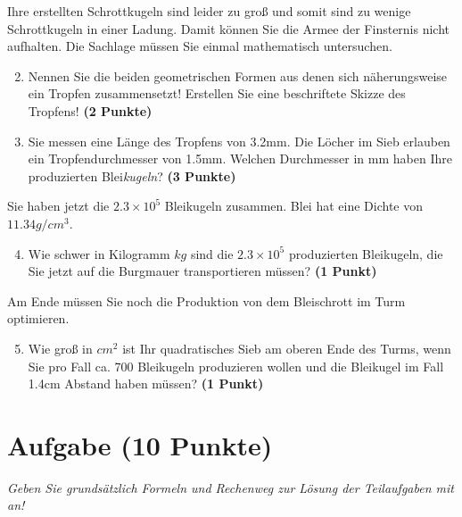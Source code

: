 \documentclass[a4paper, 9pt]{scrartcl}\usepackage[]{graphicx}\usepackage[]{xcolor}
\begin{document}
Ihre erstellten Schrottkugeln sind leider zu gro{\ss} und somit sind zu wenige
Schrottkugeln in einer Ladung. Damit k{\"o}nnen Sie die Armee der Finsternis
nicht aufhalten. Die Sachlage m{\"u}ssen Sie einmal mathematisch untersuchen.

\begin{enumerate}
  \setcounter{enumi}{1}
\item Nennen Sie die beiden geometrischen Formen aus denen sich
  n{\"a}herungsweise ein Tropfen zusammensetzt! Erstellen Sie eine beschriftete 
  Skizze des Tropfens!
  \textbf{(2 Punkte)}
\item Sie messen eine L{\"a}nge des Tropfens von 3.2mm. Die L{\"o}cher
  im Sieb erlauben ein Tropfendurchmesser von 1.5mm. Welchen
  Durchmesser in mm haben Ihre produzierten Blei\textit{kugeln}?  \textbf{(3 Punkte)}
\end{enumerate}

Sie haben jetzt die \ensuremath{2.3\times 10^{5}} Bleikugeln zusammen. Blei hat eine Dichte
von $11.34g/cm^3$.

\begin{enumerate}
  \setcounter{enumi}{3}
\item Wie schwer in Kilogramm $kg$ sind die \ensuremath{2.3\times 10^{5}} produzierten
  Bleikugeln, die Sie jetzt auf die Burgmauer transportieren m{\"u}ssen?
  \textbf{(1 Punkt)}
\end{enumerate}

Am Ende m{\"u}ssen Sie noch die Produktion von dem Bleischrott im Turm optimieren.

\begin{enumerate}
  \setcounter{enumi}{4}
\item Wie gro{\ss} in $cm^2$ ist Ihr quadratisches Sieb am oberen Ende des Turms,
  wenn Sie pro Fall ca. 700 Bleikugeln produzieren wollen und
  die Bleikugel im Fall 1.4cm Abstand haben m{\"u}ssen?  \textbf{(1
    Punkt)}
\end{enumerate}
 
\clearpage

\section{Aufgabe \hfill (10 Punkte)}

\textit{Geben Sie grunds{\"a}tzlich Formeln und Rechenweg zur L{\"o}sung der
  Teilaufgaben mit an!} \\[1Ex]
\end{document}
